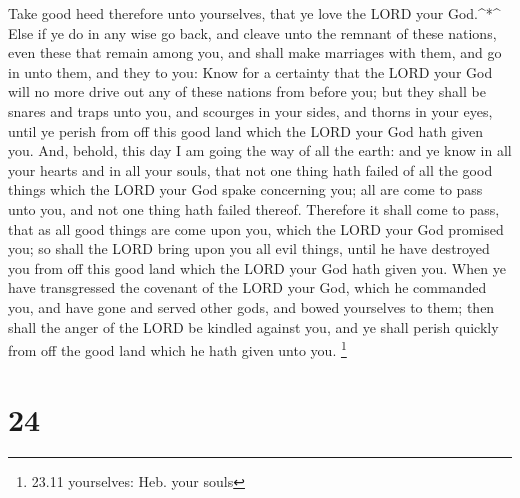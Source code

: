  Take good heed therefore unto yourselves, that ye love the
LORD your God.\^{}*\^{}  Else if ye do in any wise go back,
and cleave unto the remnant of these nations, even these that remain
among you, and shall make marriages with them, and go in unto them, and
they to you:  Know for a certainty that the LORD your God
will no more drive out any of these nations from before you; but they
shall be snares and traps unto you, and scourges in your sides, and
thorns in your eyes, until ye perish from off this good land which the
LORD your God hath given you.  And, behold, this day I am
going the way of all the earth: and ye know in all your hearts and in
all your souls, that not one thing hath failed of all the good things
which the LORD your God spake concerning you; all are come to pass unto
you, and not one thing hath failed thereof.  Therefore it
shall come to pass, that as all good things are come upon you, which the
LORD your God promised you; so shall the LORD bring upon you all evil
things, until he have destroyed you from off this good land which the
LORD your God hath given you.  When ye have transgressed
the covenant of the LORD your God, which he commanded you, and have gone
and served other gods, and bowed yourselves to them; then shall the
anger of the LORD be kindled against you, and ye shall perish quickly
from off the good land which he hath given unto you. \footnote{23.11
  yourselves: Heb. your souls}

\hypertarget{section-23}{%
\section{24}\label{section-23}}


